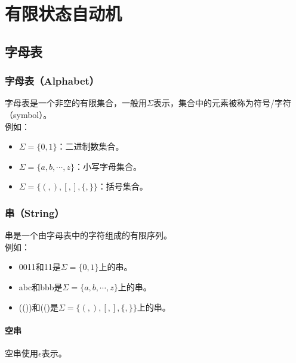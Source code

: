 \chapter{有限状态自动机}

\section{字母表}

\subsection{字母表（Alphabet）}

字母表是一个非空的有限集合，一般用$ \Sigma $表示，集合中的元素被称为符号/字符（symbol）。\\

例如：

\begin{itemize}
	\item $ \Sigma = \{0, 1\} $：二进制数集合。
	\item $ \Sigma = \{a, b, \cdots, z\} $：小写字母集合。
	\item $ \Sigma = \{(, ), [, ], \{, \}\} $：括号集合。
\end{itemize}

\vspace{0.5cm}

\subsection{串（String）}

串是一个由字母表中的字符组成的有限序列。\\

例如：

\begin{itemize}
	\item 0011和11是$ \Sigma = \{0, 1\} $上的串。
	\item abc和bbb是$ \Sigma = \{a, b, \cdots, z\} $上的串。
	\item (())和(()是$ \Sigma = \{(, ), [, ], \{, \}\} $上的串。
\end{itemize}

\vspace{0.5cm}

\subsubsection{空串}

空串使用$ \epsilon $表示。\\

